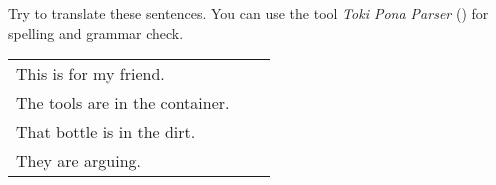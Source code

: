 Try to translate these sentences. 
You can use the tool \textit{Toki Pona Parser} (\cite{www:rowa:02}) for spelling and grammar check. 

\begin{supertabular}{p{5,5cm}|ll}
This is for my friend.  &&  \\ %
The tools are in the container.  && \\ %
That bottle is in the dirt.  &&  \\ %
They are arguing. &&  \\ %
\end{supertabular} 

%
